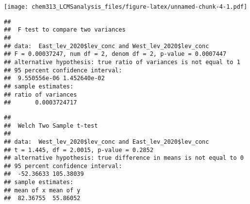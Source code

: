 \documentclass[]{article}
\newenvironment{Shaded}{\begin{snugshade}}{\end{snugshade}}
\newcommand{\KeywordTok}[1]{\textcolor[rgb]{0.13,0.29,0.53}{\textbf{#1}}}
\newcommand{\DataTypeTok}[1]{\textcolor[rgb]{0.13,0.29,0.53}{#1}}
\newcommand{\DecValTok}[1]{\textcolor[rgb]{0.00,0.00,0.81}{#1}}
\newcommand{\CommentTok}[1]{\textcolor[rgb]{0.56,0.35,0.01}{\textit{#1}}}
\newcommand{\OtherTok}[1]{\textcolor[rgb]{0.56,0.35,0.01}{#1}}
\newcommand{\OperatorTok}[1]{\textcolor[rgb]{0.81,0.36,0.00}{\textbf{#1}}}
\newcommand{\NormalTok}[1]{#1}
\begin{document}
\texttt{[image: chem313\_LCMSanalysis\_files/figure-latex/unnamed-chunk-4-1.pdf]}

\begin{Shaded}
\end{Shaded}

\begin{verbatim}
## 
##  F test to compare two variances
## 
## data:  East_lev_2020$lev_conc and West_lev_2020$lev_conc
## F = 0.00037247, num df = 2, denom df = 2, p-value = 0.0007447
## alternative hypothesis: true ratio of variances is not equal to 1
## 95 percent confidence interval:
##  9.550556e-06 1.452640e-02
## sample estimates:
## ratio of variances 
##       0.0003724717
\end{verbatim}

\begin{Shaded}
\end{Shaded}

\begin{verbatim}
## 
##  Welch Two Sample t-test
## 
## data:  West_lev_2020$lev_conc and East_lev_2020$lev_conc
## t = 1.445, df = 2.0015, p-value = 0.2852
## alternative hypothesis: true difference in means is not equal to 0
## 95 percent confidence interval:
##  -52.36633 105.38039
## sample estimates:
## mean of x mean of y 
##  82.36755  55.86052
\end{verbatim}
\end{document}
